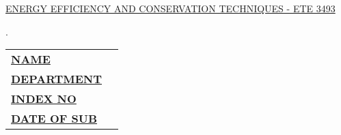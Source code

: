 \documentclass[12pt,a4paper]{article}
\begin{document}
\begin{titlepage}
	
	\begin{flushright}
        \textbf{\uppercase{\fontsize{12}{18} \selectfont {Assignment No: 01}}}
    \end{flushright}

    \vspace*{\fill}
    \begin{center}
        \uppercase{\fontsize{22}{45}\selectfont \ul{ENERGY EFFICIENCY AND CONSERVATION TECHNIQUES - ETE 3493}}\\
    \end{center}
    \vfill %
    \begin{multicols}{2}
        .
        \\

        \columnbreak	
        \begin{tabular}{ll}
            \vspace{6pt}

            \textbf{\uppercase{\underline{Name}}}       &
            \textbf{\uppercase{\fontsize{12}{18} \selectfont {:}}} 
            {\fontsize{12}{18} \selectfont {B Gnanakeethan}}      \\

            \vspace{6pt}
            \textbf{\uppercase{\underline{Department}}} &
            \textbf{\uppercase{\fontsize{12}{18} \selectfont {:}}} 
            {\fontsize{12}{18} \selectfont {Eng. Tech}}\\

            \vspace{6pt}
            \textbf{\uppercase{\underline{Index No}}}   &
            \textbf{\uppercase{\fontsize{12}{18} \selectfont {:}}} 
            {\fontsize{12}{18} \selectfont {EGT/16/437}}  \\

            \vspace{6pt}
            \textbf{\uppercase{\underline{Date of Sub}}}   &
            \textbf{\uppercase{\fontsize{12}{18} \selectfont {:}}} 
            {\fontsize{12}{18} \selectfont {17/07/2019}}  \\


        \end{tabular}
    \end{multicols}

\end{titlepage}
\end{document}
